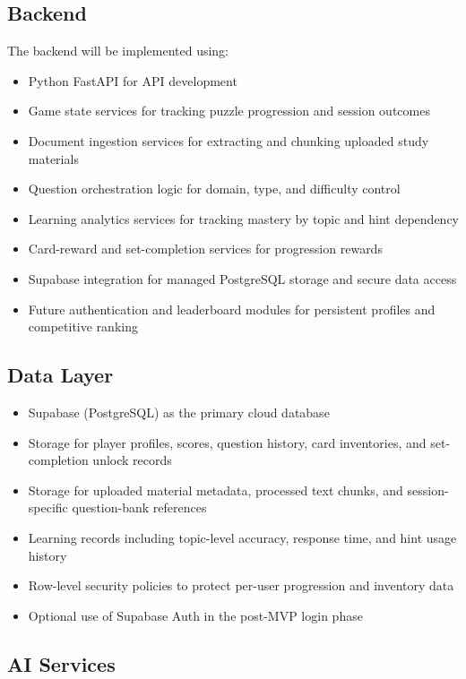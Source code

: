 \documentclass[12pt]{article}
\begin{document}
\subsection{Backend}

The backend will be implemented using:
\begin{itemize}
    \item Python FastAPI for API development
    \item Game state services for tracking puzzle progression and session outcomes
    \item Document ingestion services for extracting and chunking uploaded study materials
    \item Question orchestration logic for domain, type, and difficulty control
    \item Learning analytics services for tracking mastery by topic and hint dependency
    \item Card-reward and set-completion services for progression rewards
    \item Supabase integration for managed PostgreSQL storage and secure data access
    \item Future authentication and leaderboard modules for persistent profiles and competitive ranking
\end{itemize}

\subsection{Data Layer}

\begin{itemize}
    \item Supabase (PostgreSQL) as the primary cloud database
    \item Storage for player profiles, scores, question history, card inventories, and set-completion unlock records
    \item Storage for uploaded material metadata, processed text chunks, and session-specific question-bank references
    \item Learning records including topic-level accuracy, response time, and hint usage history
    \item Row-level security policies to protect per-user progression and inventory data
    \item Optional use of Supabase Auth in the post-MVP login phase
\end{itemize}

\subsection{AI Services}
\end{document}
